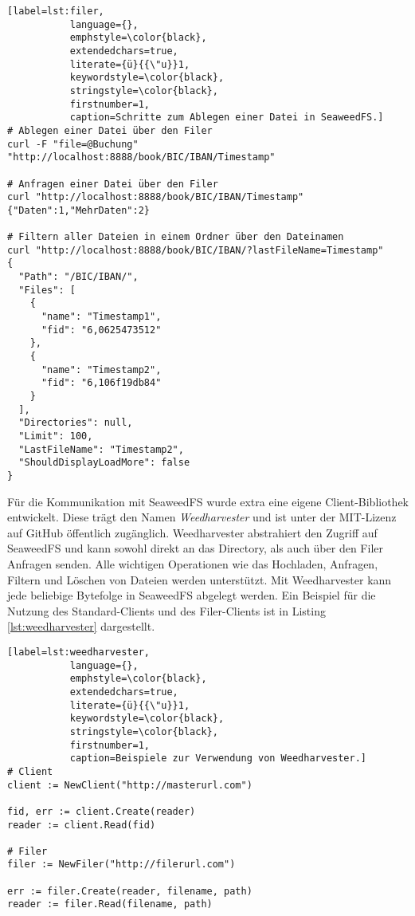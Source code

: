 \documentclass[12pt,oneside,a4paper,parskip]{scrbook}
\begin{document}
\begin{minipage}{\linewidth}
\begin{lstlisting}[label=lst:filer,
           language={},
           emphstyle=\color{black},
           extendedchars=true,
           literate={ü}{{\"u}}1,
           keywordstyle=\color{black},
           stringstyle=\color{black},
           firstnumber=1,
           caption=Schritte zum Ablegen einer Datei in SeaweedFS.]           
# Ablegen einer Datei über den Filer
curl -F "file=@Buchung" "http://localhost:8888/book/BIC/IBAN/Timestamp"

# Anfragen einer Datei über den Filer
curl "http://localhost:8888/book/BIC/IBAN/Timestamp"
{"Daten":1,"MehrDaten":2}

# Filtern aller Dateien in einem Ordner über den Dateinamen
curl "http://localhost:8888/book/BIC/IBAN/?lastFileName=Timestamp"
{
  "Path": "/BIC/IBAN/",
  "Files": [
    {
      "name": "Timestamp1",
      "fid": "6,0625473512"
    },
    {
      "name": "Timestamp2",
      "fid": "6,106f19db84"
    }
  ],
  "Directories": null,
  "Limit": 100,
  "LastFileName": "Timestamp2",
  "ShouldDisplayLoadMore": false
}
\end{lstlisting}
\end{minipage}

Für die Kommunikation mit SeaweedFS wurde extra eine eigene Client-Bibliothek entwickelt. Diese trägt den Namen \textit{Weedharvester} und ist unter der MIT-Lizenz auf GitHub öffentlich zugänglich. Weedharvester abstrahiert den Zugriff auf SeaweedFS und kann sowohl direkt an das Directory, als auch über den Filer Anfragen senden. Alle wichtigen Operationen wie das Hochladen, Anfragen, Filtern und Löschen von Dateien werden unterstützt. Mit Weedharvester kann jede beliebige Bytefolge in SeaweedFS abgelegt werden. Ein Beispiel für die Nutzung des Standard-Clients und des Filer-Clients ist in Listing \ref{lst:weedharvester} dargestellt.

\begin{minipage}{\linewidth}
\begin{lstlisting}[label=lst:weedharvester,
           language={},
           emphstyle=\color{black},
           extendedchars=true,
           literate={ü}{{\"u}}1,
           keywordstyle=\color{black},
           stringstyle=\color{black},
           firstnumber=1,
           caption=Beispiele zur Verwendung von Weedharvester.]          
# Client
client := NewClient("http://masterurl.com")

fid, err := client.Create(reader)
reader := client.Read(fid)

# Filer
filer := NewFiler("http://filerurl.com")

err := filer.Create(reader, filename, path)
reader := filer.Read(filename, path)
\end{lstlisting}
\end{minipage}
\end{document}
